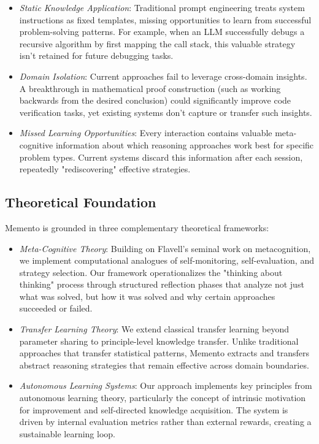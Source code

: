 \documentclass[10pt,a4paper,twocolumn]{article}
\begin{document}
\begin{itemize}
    \item \textit{Static Knowledge Application}: Traditional prompt engineering treats system instructions as fixed templates, missing opportunities to learn from successful problem-solving patterns. For example, when an LLM successfully debugs a recursive algorithm by first mapping the call stack, this valuable strategy isn't retained for future debugging tasks.

\item \textit{Domain Isolation}: Current approaches fail to leverage cross-domain insights. A breakthrough in mathematical proof construction (such as working backwards from the desired conclusion) could significantly improve code verification tasks, yet existing systems don't capture or transfer such insights.

\item \textit{Missed Learning Opportunities}: Every interaction contains valuable meta-cognitive information about which reasoning approaches work best for specific problem types. Current systems discard this information after each session, repeatedly "rediscovering" effective strategies.
\end{itemize}


\subsection{Theoretical Foundation}

Memento is grounded in three complementary theoretical frameworks:

\begin{itemize}
    \item \textit{Meta-Cognitive Theory}: Building on Flavell's seminal work on metacognition, we implement computational analogues of self-monitoring, self-evaluation, and strategy selection. Our framework operationalizes the "thinking about thinking" process through structured reflection phases that analyze not just what was solved, but how it was solved and why certain approaches succeeded or failed.

\item \textit{Transfer Learning Theory}: We extend classical transfer learning beyond parameter sharing to principle-level knowledge transfer. Unlike traditional approaches that transfer statistical patterns, Memento extracts and transfers abstract reasoning strategies that remain effective across domain boundaries.

\item \textit{Autonomous Learning Systems}: Our approach implements key principles from autonomous learning theory, particularly the concept of intrinsic motivation for improvement and self-directed knowledge acquisition. The system is driven by internal evaluation metrics rather than external rewards, creating a sustainable learning loop.
\end{itemize}
\end{document}
